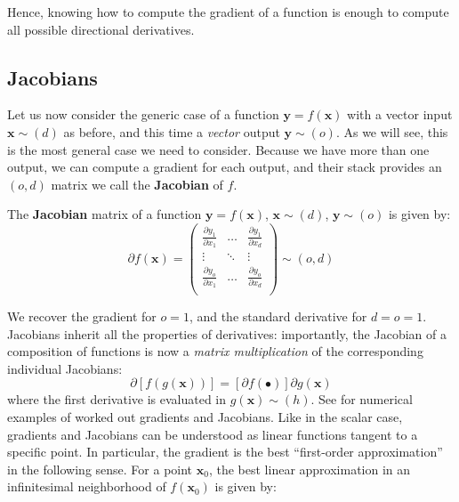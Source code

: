Hence, knowing how to compute the gradient of a function is enough to compute all possible directional derivatives.

\subsection{Jacobians}

Let us now consider the generic case of a function $\mathbf{y} = f(\mathbf{x})$ \addclock with a vector input $\mathbf{x} \sim (d)$ as before, and this time a \textit{vector} output $\mathbf{y} \sim(o)$. As we will see, this is the most general case we need to consider. Because we have more than one output, we can compute a gradient for each output, and their stack provides an $(o, d)$ matrix we call the \textbf{Jacobian} of $f$.

\begin{definition}[Jacobian]
The \textbf{Jacobian} matrix of a function $\mathbf{y} = f(\mathbf{x})$, $\mathbf{x} \sim (d)$, $\mathbf{y} \sim (o)$ is given by:
%
\begin{equation}
\partial f(\mathbf{x}) = \begin{pmatrix}				\frac{\partial y_1}{\partial x_1} & \dots & \frac{\partial y_1}{\partial x_d} \\				\vdots & \ddots & \vdots \\				\frac{\partial y_o}{\partial x_1} & \dots & \frac{\partial y_o}{\partial x_d} \\			\end{pmatrix} \sim (o,d)
\end{equation}
\end{definition}

We recover the gradient for $o=1$, and the standard derivative for $d=o=1$. Jacobians inherit all the properties of derivatives: importantly, the Jacobian of a composition of functions is now a \textit{matrix multiplication} of the corresponding individual Jacobians:
%
\begin{equation}
\partial\left[f(g(\mathbf{x}))\right] = \left[\partial f(\bullet)\right]\partial g(\mathbf{x})
\label{eq:jacobian_chain_rule}
\end{equation}
%
where the first derivative is evaluated in $g(\mathbf{x}) \sim (h)$. See \cite[Chapter 2]{petersen2008matrix} for numerical examples of worked out gradients and Jacobians. Like in the scalar case, gradients and Jacobians can be understood as linear functions tangent to a specific point. In particular, the gradient is the best “first-order approximation” in the following sense. For a point $\mathbf{x}_0$, the best linear approximation in an infinitesimal neighborhood of $f(\mathbf{x}_0)$ is given by:

